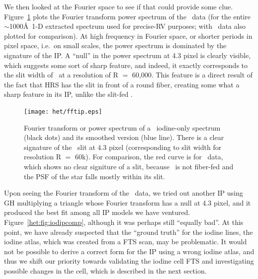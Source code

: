 We then looked at the Fourier space to see if that could provide some
clue. Figure~\ref{het:fig:fftip} plots the Fourier transform power
spectrum of the \het\ data (for the entire $\sim$1000\AA\ 1-D
extracted spectrum used for precise-RV purposes; with \keck\ data
also plotted for comparison). At high frequency in Fourier space, or
shorter periods in pixel space, i.e.\ on small scales, the power
spectrum is dominated by the signature of the IP. A ``null'' in the
power spectrum at 4.3 pixel is clearly visible, which suggests some
sort of sharp feature, and indeed, it exactly corresponds to the slit
width of \het\ at a resolution of R $=$ 60,000. This feature is a
direct result of the fact that HRS has the slit in front of a round
fiber, creating some what a sharp feature in its IP, unlike the
slit-fed \keck. 


\begin{figure}
\centering
\texttt{[image: het/fftip.eps]}
\caption{Fourier transform or power spectrum of a \het\ iodine-only
  spectrum (black dots) and its smoothed version (blue line). There is
  a clear signature of the \het\ slit at 4.3 pixel (corresponding to
  slit width for resolution R $=$ 60k). For comparison, the red curve
  is for \keck\ data, which shows no clear signiture of a slit,
  because \keck\ is not fiber-fed and the PSF of the star falls mostly
  within its slit.
\label{het:fig:fftip}}
\end{figure}


Upon seeing the Fourier transform of the \het\ data, we tried out
another IP using GH multiplying a triangle whose Fourier transform has
a null at 4.3 pixel, and it produced the best fit among all IP models
we have ventured. Figure~\ref{het:fig:iodipcomp}, although it was
perhaps still ``equally bad''. At this point, we have already
suspected that the ``ground truth'' for the iodine lines, the iodine
atlas, which was created from a FTS scan, may be problematic. It would
not be possible to derive a correct form for the IP using a wrong
iodine atlas, and thus we shift our priority towards validating the
iodine cell FTS and investigating possible changes in the cell, which
is described in the next section.


